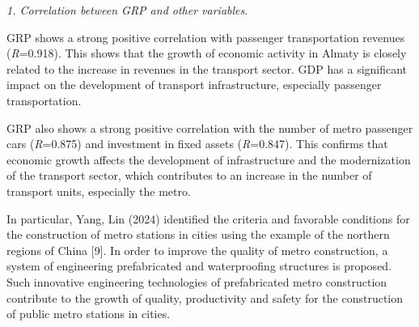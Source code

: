 
\emph{1. Correlation between GRP and other variables}.

GRP shows a strong positive correlation with passenger transportation
revenues (\emph{R}=0.918). This shows that the growth of economic
activity in Almaty is closely related to the increase in revenues in the
transport sector. GDP has a significant impact on the development of
transport infrastructure, especially passenger transportation.

GRP also shows a strong positive correlation with the number of metro
passenger cars (\emph{R}=0.875) and investment in fixed assets
(\emph{R}=0.847). This confirms that economic growth affects the
development of infrastructure and the modernization of the transport
sector, which contributes to an increase in the number of transport
units, especially the metro.

In particular, Yang, Lin (2024) identified the criteria and favorable
conditions for the construction of metro stations in cities using the
example of the northern regions of China {[}9{]}. In order to improve
the quality of metro construction, a system of engineering prefabricated
and waterproofing structures is proposed. Such innovative engineering
technologies of prefabricated metro construction contribute to the
growth of quality, productivity and safety for the construction of
public metro stations in cities.

